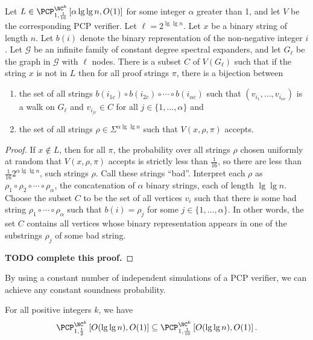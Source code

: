 \documentclass[]{article}
\newcommand{\PCPcs}[5]{\PCP^{#1}_{#2, #3}\left[#4, #5\right]}
\begin{document}
\begin{lemma}\label{lem:badsubset}
  Let $L \in \PCPcs{\NC^k}{1}{\frac{1}{16}}{\alpha \lg \lg n}{O(1)}$ for some integer $\alpha$ greater than 1, and let $V$ be the corresponding PCP verifier.
  Let $\ell = 2^{\lg \lg n}$.
  Let $x$ be a binary string of length $n$.
  Let $b(i)$ denote the binary representation of the non-negative integer $i$.
  Let $\mathcal{G}$ be an infinite family of constant degree spectral expanders, and let $G_\ell$ be the graph in $\mathcal{G}$ with $\ell$ nodes.
  There is a subset $C$ of $V(G_\ell)$ such that if the string $x$ is not in $L$ then for all proof strings $\pi$, there is a bijection between
  \begin{enumerate}
  \item the set of all strings $b(i_{1c}) \circ b(i_{2c}) \circ \dotsb \circ b(i_{\alpha c})$ such that $(v_{i_1}, \dotsc, v_{i_{\alpha c}})$ is a walk on $G_\ell$ and $v_{i_{jc}} \in C$ for all $j \in \{1, \dotsc, \alpha\}$ and
  \item the set of all strings $\rho \in \Sigma^{\alpha \lg \lg n}$ such that $V(x, \rho, \pi)$ accepts.
  \end{enumerate}
\end{lemma}
\begin{proof}
  If $x \notin L$, then for all $\pi$, the probability over all strings $\rho$ chosen uniformly at random that $V(x, \rho, \pi)$ accepts is strictly less than $\frac{1}{16}$, so there are less than $\frac{1}{16} 2^{\alpha \lg \lg n}$, such strings $\rho$.
  Call these strings ``bad''.
  Interpret each $\rho$ as $\rho_1 \circ \rho_2 \circ \dotsb \circ \rho_\alpha$, the concatenation of $\alpha$ binary strings, each of length $\lg \lg n$.
  Choose the subset $C$ to be the set of all vertices $v_i$ such that there is some bad string $\rho_1 \circ \dotsb \circ \rho_\alpha$ such that $b(i) = \rho_j$ for some $j \in \{1, \dotsc, \alpha\}$.
  In other words, the set $C$ contains all vertices whose binary representation appears in one of the substrings $\rho_j$ of some bad string.

  \textbf{TODO complete this proof.}
\end{proof}

By using a constant number of independent simulations of a PCP verifier, we can achieve any constant soundness probability.

\begin{lemma}\label{lem:16}
  For all positive integers $k$, we have
  \begin{equation*}
    \PCPcs{\NC^k}{1}{\frac{1}{2}}{O(\lg \lg n)}{O(1)}
    \subseteq
    \PCPcs{\NC^k}{1}{\frac{1}{16}}{O(\lg \lg n)}{O(1)}.
  \end{equation*}
\end{lemma}
\end{document}
